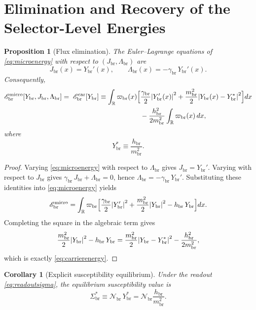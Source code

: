 \documentclass[11pt]{article}
\newcommand{\ProfWeight}{\varpi_{\mathrm{br}}}
\newcommand{\RespSusEq}{\Sigma_{\mathrm{br}}^{\ast}}
\newcommand{\RespCarrier}{Y_{\mathrm{br}}}
\newcommand{\RespCarrierEq}{Y_{\mathrm{br}}^{\ast}}
\newcommand{\RespFlux}{J_{\mathrm{br}}}
\newcommand{\RespCompat}{\Lambda_{\mathrm{br}}}
\newcommand{\RespNorm}{\mathcal N_{\mathrm{br}}}
\newcommand{\RespFluxCoeff}{\gamma_{\mathrm{br}}}
\newcommand{\RespGap}{m_{\mathrm{br}}}
\newcommand{\RespBias}{h_{\mathrm{br}}}
\newcommand{\RespMicroEnergy}{\mathscr E_{\mathrm{br}}^{\mathrm{micro}}}
\newcommand{\RespCarrierEnergy}{\mathscr E_{\mathrm{br}}^{\mathrm{car}}}
\newtheorem{proposition}{Proposition}
\newtheorem{corollary}{Corollary}
\begin{document}
\section{Elimination and Recovery of the Selector-Level Energies}

\begin{proposition}[Flux elimination]
\label{prop:fluxelim}
The Euler--Lagrange equations of \eqref{eq:microenergy} with respect to \((\RespFlux,\RespCompat)\) are
\begin{equation}
\RespFlux(x)=\RespCarrier'(x),
\qquad
\RespCompat(x)=-\RespFluxCoeff\,\RespCarrier'(x).
\label{eq:fluxresolution}
\end{equation}
Consequently,
\begin{align}
\RespMicroEnergy[\RespCarrier,\RespFlux,\RespCompat]
=\;
\RespCarrierEnergy[\RespCarrier]
\equiv
\int_{\mathbb R}\ProfWeight(x)\Bigl[
&\frac{\RespFluxCoeff}{2}\abs{\RespCarrier'(x)}^2
+\frac{\RespGap^2}{2}\abs{\RespCarrier(x)-\RespCarrierEq}^2
\Bigr]dx
\nonumber\\
&-\frac{\RespBias^2}{2\RespGap^2}\int_{\mathbb R}\ProfWeight(x)\,dx,
\label{eq:carrierenergy}
\end{align}
where
\begin{equation}
\RespCarrierEq\equiv \frac{\RespBias}{\RespGap^2}.
\label{eq:carriereq}
\end{equation}
\end{proposition}

\begin{proof}
Varying \eqref{eq:microenergy} with respect to \(\RespCompat\) gives \(\RespFlux=\RespCarrier'\). Varying with respect to \(\RespFlux\) gives \(\RespFluxCoeff\,\RespFlux+\RespCompat=0\), hence \(\RespCompat=-\RespFluxCoeff\,\RespCarrier'\). Substituting these identities into \eqref{eq:microenergy} yields
\[
\RespMicroEnergy
=
\int_{\mathbb R}\ProfWeight\Bigl[
\frac{\RespFluxCoeff}{2}\abs{\RespCarrier'}^2
+\frac{\RespGap^2}{2}\abs{\RespCarrier}^2
-\RespBias\,\RespCarrier
\Bigr]dx.
\]
Completing the square in the algebraic term gives
\[
\frac{\RespGap^2}{2}\abs{\RespCarrier}^2-\RespBias\,\RespCarrier
=
\frac{\RespGap^2}{2}\abs{\RespCarrier-\RespCarrierEq}^2
-\frac{\RespBias^2}{2\RespGap^2},
\]
which is exactly \eqref{eq:carrierenergy}.
\end{proof}

\begin{corollary}[Explicit susceptibility equilibrium]
\label{cor:sigmaeq}
Under the readout \eqref{eq:readoutsigma}, the equilibrium susceptibility value is
\begin{equation}
\RespSusEq
\equiv
\RespNorm\,\RespCarrierEq
=
\RespNorm\frac{\RespBias}{\RespGap^2}.
\label{eq:sigmaeq}
\end{equation}
\end{corollary}
\end{document}
